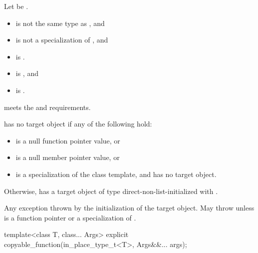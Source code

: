 \begin{itemdescr}
\pnum
Let  be .

\pnum
\constraints
\begin{itemize}
\item
{} is not the same type as , and
\item
{} is not a specialization of , and
\item
{} is .
\end{itemize}

\pnum
\mandates
\begin{itemize}
\item
{} is , and
\item
{} is .
\end{itemize}

\pnum
\expects
{} meets the  and
 requirements.

\pnum
\ensures
{} has no target object if any of the following hold:
\begin{itemize}
\item
{} is a null function pointer value, or
\item
{} is a null member pointer value, or
\item
{} is a specialization of
the  class template,
and  has no target object.
\end{itemize}
Otherwise,  has a target object of type 
direct-non-list-initialized with .

\pnum
\throws
Any exception thrown by the initialization of the target object.
May throw  unless  is
a function pointer or a specialization of .
\end{itemdescr}

%
\begin{itemdecl}
template<class T, class... Args>
  explicit copyable_function(in_place_type_t<T>, Args&&... args);
\end{itemdecl}

